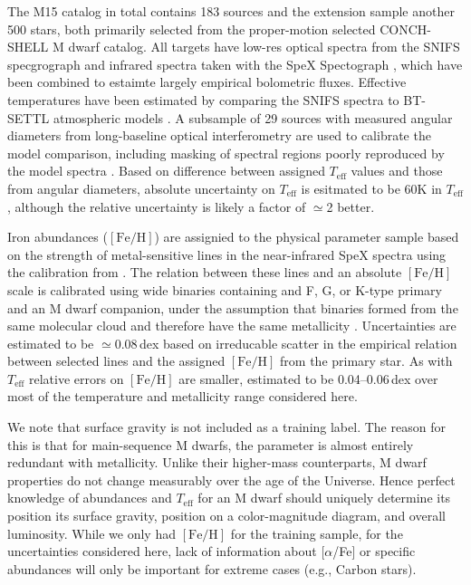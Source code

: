 \documentclass[modern]{aastex62}
\newcommand{\teff}{T_{\mathrm{eff}}}
\newcommand{\feh}{[{\mathrm{Fe}/\mathrm{H}}]}
\begin{document}
The M15 catalog in total contains 183 sources and the extension sample another 500 stars, both primarily selected from the proper-motion selected CONCH-SHELL \citep{Gaidos:2013} M dwarf catalog. All targets have low-res optical spectra from the SNIFS specgrograph \citep{Lantz:2004} and infrared spectra taken with the SpeX Spectograph \citep{Rayner:2003}, which have been combined to estaimte largely empirical bolometric fluxes. Effective temperatures have been estimated by comparing the SNIFS spectra to BT-SETTL atmospheric models \citep{Allard:2011}. A subsample of 29 sources with measured angular diameters from long-baseline optical interferometry \citep{Boyajian:2012} are used to calibrate the model comparison, including masking of spectral regions poorly reproduced by the model spectra \citep{Mann:2013c}. Based on difference between assigned $\teff$ values and those from angular diameters, absolute uncertainty on $\teff$ is esitmated to be 60K in $\teff$, although the relative uncertainty is likely a factor of $\simeq$2 better.

Iron abundances ($\feh$) are assignied to the physical parameter sample based on the strength of metal-sensitive lines in the near-infrared SpeX spectra \citep{RojasAyala:2010} using the calibration from \citet{Mann:2013a}. The relation between these lines and an absolute $\feh$scale is calibrated using wide binaries containing and F, G, or K-type primary and an M dwarf companion, under the assumption that binaries formed from the same molecular cloud and therefore have the same metallicity \citep{Bonfils:2005}. Uncertainties are estimated to be $\simeq$0.08\,dex based on irreducable scatter in the empirical relation between selected lines and the assigned $\feh$ from the primary star. As with $\teff$ relative errors on $\feh$ are smaller, estimated to be 0.04--0.06\,dex over most of the temperature and metallicity range considered here.

We note that surface gravity is not included as a training label. The reason for this is that for main-sequence M dwarfs, the parameter is almost entirely redundant with metallicity. Unlike their higher-mass counterparts, M dwarf properties do not change measurably over the age of the Universe. Hence perfect knowledge of abundances and $\teff$ for an M dwarf should uniquely determine its position its surface gravity, position on a color-magnitude diagram, and overall luminosity. While we only had $\feh$ for the training sample, for the uncertainties considered here, lack of information about [$\alpha$/Fe] or specific abundances will only be important for extreme cases (e.g., Carbon stars). 
\end{document}
